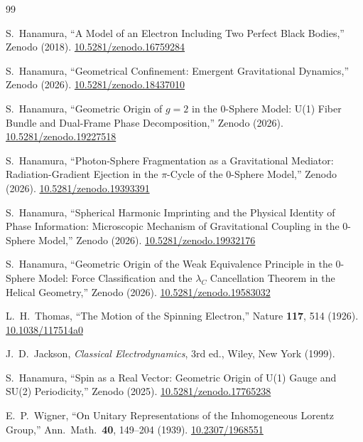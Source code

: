 \documentclass[%
 reprint, amsmath,amssymb, aps, prb, ]{revtex4-2}
\numberwithin{equation}{section}
\begin{document}
\begin{thebibliography}{99}

S.~Hanamura, ``A Model of an Electron Including Two Perfect Black Bodies,''
Zenodo (2018). \href{https://doi.org/10.5281/zenodo.16759284}{10.5281/zenodo.16759284}

S.~Hanamura, ``Geometrical Confinement: Emergent Gravitational Dynamics,''
Zenodo (2026). \href{https://doi.org/10.5281/zenodo.18437010}{10.5281/zenodo.18437010}

S.~Hanamura, ``Geometric Origin of $g=2$ in the 0-Sphere Model:
U(1) Fiber Bundle and Dual-Frame Phase Decomposition,''
Zenodo (2026). \href{https://doi.org/10.5281/zenodo.19227518}{10.5281/zenodo.19227518}

S.~Hanamura, ``Photon-Sphere Fragmentation as a Gravitational Mediator:
Radiation-Gradient Ejection in the $\pi$-Cycle of the 0-Sphere Model,''
Zenodo (2026). \href{https://doi.org/10.5281/zenodo.19393391}{10.5281/zenodo.19393391}

S.~Hanamura, ``Spherical Harmonic Imprinting and the Physical Identity of
Phase Information: Microscopic Mechanism of Gravitational Coupling in the
0-Sphere Model,'' Zenodo (2026).
\href{https://doi.org/10.5281/zenodo.19932176}{10.5281/zenodo.19932176}

S.~Hanamura, ``Geometric Origin of the Weak Equivalence Principle in the
0-Sphere Model: Force Classification and the $\lambda_C$ Cancellation
Theorem in the Helical Geometry,'' Zenodo (2026).
\href{https://doi.org/10.5281/zenodo.19583032}{10.5281/zenodo.19583032}

L.~H.~Thomas, ``The Motion of the Spinning Electron,''
Nature \textbf{117}, 514 (1926). \href{https://doi.org/10.1038/117514a0}{10.1038/117514a0}

J.~D.~Jackson, \textit{Classical Electrodynamics}, 3rd ed.,
Wiley, New York (1999).

S.~Hanamura, ``Spin as a Real Vector: Geometric Origin of U(1) Gauge
and SU(2) Periodicity,'' Zenodo (2025). \href{https://doi.org/10.5281/zenodo.17765238}{10.5281/zenodo.17765238}

E.~P.~Wigner, ``On Unitary Representations of the Inhomogeneous Lorentz Group,''
Ann.\ Math.\ \textbf{40}, 149--204 (1939). \href{https://doi.org/10.2307/1968551}{10.2307/1968551}


\end{thebibliography}
\end{document}
